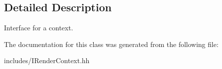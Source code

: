 \subsection{Detailed Description}
Interface for a context. 

The documentation for this class was generated from the following file\-:\begin{DoxyCompactItemize}
\item 
includes/I\-Render\-Context.\-hh\end{DoxyCompactItemize}
